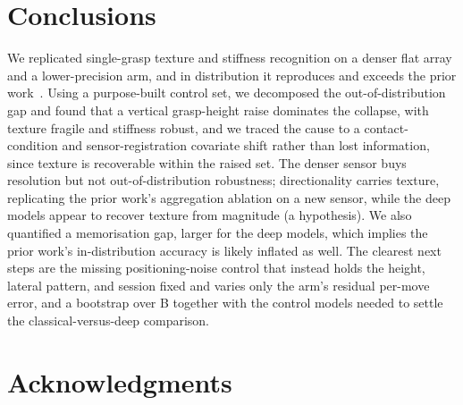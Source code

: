 \documentclass[journal]{IEEEtran}
\begin{document}
\section{Conclusions} %
\label{sec:conclusions}
%
We replicated single-grasp texture and stiffness recognition on a denser flat array
and a lower-precision arm, and in distribution it reproduces and exceeds the prior
work~\cite{cmd_source}. Using a purpose-built control set, we decomposed the
out-of-distribution gap and found that a vertical grasp-height raise dominates the
collapse, with texture fragile and stiffness robust, and we traced the cause to a
contact-condition and sensor-registration covariate shift rather than lost
information, since texture is recoverable within the raised set. The denser sensor
buys resolution but not out-of-distribution robustness; directionality carries
texture, replicating the prior work's aggregation ablation on a new sensor, while the
deep models appear to recover texture from magnitude (a hypothesis). We also
quantified a memorisation gap, larger for the deep models, which implies the prior
work's in-distribution accuracy is likely inflated as well. The clearest next steps
are the missing positioning-noise control that instead holds the height, lateral
pattern, and session fixed and varies only the arm's residual per-move error, and a
bootstrap over B together with the control models needed to settle the
classical-versus-deep comparison.

\section*{Acknowledgments}
\end{document}
